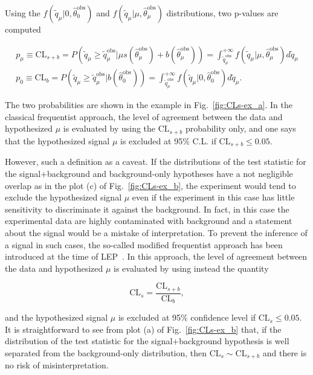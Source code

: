 Using the $f(\tilde{q}_\mu|0,\hat{\theta}_0^\mathrm{obs})$ and $f(\tilde{q}_\mu|\mu,\hat{\theta}_\mu^\mathrm{obs})$ distributions,
two p-values are computed

\begin{equation}
\begin{gathered}
p_\mu \equiv \mathrm{CL}_{s+b} = P(\tilde{q}_\mu \geq \tilde{q}_\mu^\mathrm{obs}|\mu s(\hat{\theta}_\mu^\mathrm{obs}) + b(\hat{\theta}_\mu^\mathrm{obs})) = \int_{\tilde{q}_\mu^\mathrm{obs}}^{+\infty} f(\tilde{q}_\mu|\mu,\hat{\theta}_\mu^\mathrm{obs})d\tilde{q}_\mu \\
p_0 \equiv \mathrm{CL}_{b} = P(\tilde{q}_\mu \geq \tilde{q}_\mu^\mathrm{obs}|b(\hat{\theta}_0^\mathrm{obs})) = \int_{\tilde{q}_\mu^\mathrm{obs}}^{+\infty} f(\tilde{q}_\mu|0,\hat{\theta}_0^\mathrm{obs})d\tilde{q}_\mu.
\end{gathered}
\label{eqn:pvalues}
\end{equation}

The two probabilities are shown in the example in Fig.~\ref{fig:CLs-ex_a}.
In the classical frequentist approach, the level of agreement between the data and hypothesized $\mu$ is evaluated by using the $\mathrm{CL}_{s+b}$ probability only,
and one says that the hypothesized signal $\mu$ is excluded at 95\% C.L. if $\mathrm{CL}_{s+b} \leq 0.05$.

However, such a definition as a caveat. If the distributions of the test statistic for the signal+background and background-only hypotheses have a not negligible overlap as in the plot (c) of Fig.~\ref{fig:CLs-ex_b},
the experiment would tend to exclude the hypothesized signal $\mu$ even if the experiment in this case has little sensitivity to discriminate it against the background.
In fact, in this case the experimental data are highly contaminated with background and a statement about the signal would be a mistake of interpretation.
To prevent the inference of a signal in such cases, the so-called modified frequentist approach has been introduced at the time of LEP~\cite{CLs1,Junk:1999kv}.
In this approach, the level of agreement between the data and hypothesized $\mu$ is evaluated by using instead the quantity 

\begin{equation}
\mathrm{CL}_s = \frac{\mathrm{CL}_{s+b}}{\mathrm{CL}_b},
\end{equation}

and the hypothesized signal $\mu$ is excluded at 95\% confidence level if $\mathrm{CL}_s \leq 0.05$.
It is straightforward to see from plot (a) of Fig.~\ref{fig:CLs-ex_b} that, if the distribution of the test statistic for the signal+background hypothesis
is well separated from the background-only distribution, then $\mathrm{CL}_s \sim \mathrm{CL}_{s+b}$ and there is no risk of misinterpretation.

